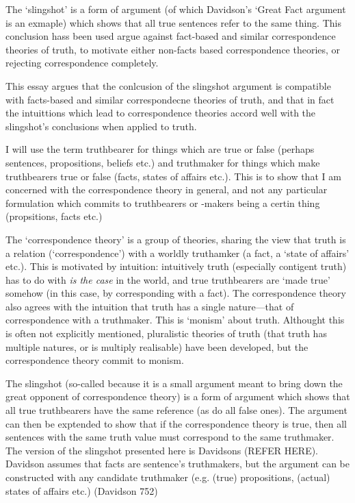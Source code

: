 The `slingshot' is a form of argument (of which Davidson's `Great Fact argument is an exmaple) which shows that all true sentences refer to the same thing.
This conclusion hass been used argue against fact-based and similar correspondence theories of truth, to motivate either non-facts based correspondence theories, or rejecting correspondence completely.

This essay argues that the conlcusion of the slingshot argument is compatible with facts-based and similar correspondecne theories of truth, and that in fact the intuittions which lead to correspondence theories accord well with the slingshot's conclusions when applied to truth.

I will use the term truthbearer for things which are true or false (perhaps sentences, propositions, beliefs etc.) and truthmaker for things which make truthbearers true or false (facts, states of affairs etc.).
This is to show that I am concerned with the correspondence theory in general, and not any particular formulation which commits to truthbearers or -makers being a certin thing (propsitions, facts etc.)

The `correspondence theory' is a group of theories, sharing the view that truth is a relation (`correspondence') with a worldly truthamker (a fact, a `state of affairs' etc.).
This is motivated by intuition: intuitively truth  (especially contigent truth) has to do with \emph{is the case} in the world, and true truthbearers are `made true' somehow (in this case, by corresponding with a fact).
The correspondence theory also agrees with the intuition that truth has a single nature---that of correspondence with a truthmaker.
This is `monism' about truth.
Althought this is often not explicitly mentioned, pluralistic theories of truth (that truth has multiple natures, or is multiply realisable) have been developed, but the correspondence theory commit to monism.

The slingshot (so-called because it is a small argument meant to bring down the great opponent of correspondence theory) is a form of argument which shows that all true truthbearers have the same reference (as do all false ones).
The argument can then be exptended to show that if the correspondence theory is true, then all sentences with the same truth value must correspond to the same truthmaker.
The version of the slingshot presented here is Davidsons (REFER HERE).
Davidson assumes that facts are sentence's truthmakers, but the argument can be constructed  with any candidate truthmaker (e.g. (true) propositions, (actual) states of affairs etc.)
(Davidson 752)

